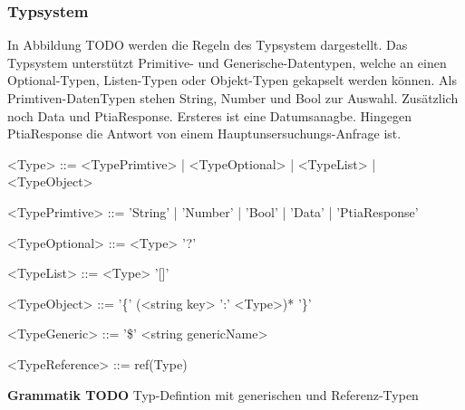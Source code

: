 \documentclass{article}
\begin{document}
    \subsubsection{Typsystem}
    In Abbildung TODO werden die Regeln des Typsystem dargestellt.
    Das Typsystem unterstützt Primitive- und Generische-Datentypen, welche an einen Optional-Typen, Listen-Typen oder Objekt-Typen gekapselt werden können.
    Als Primtiven-DatenTypen stehen String, Number und Bool zur Auswahl. Zusätzlich noch Data und PtiaResponse. 
    Ersteres ist eine Datumsanagbe. Hingegen PtiaResponse die Antwort von einem Hauptunsersuchungs-Anfrage ist.\\
    \begin{grammar}
        <Type> ::= <TypePrimtive> | <TypeOptional> | <TypeList> | <TypeObject>

        <TypePrimtive> ::= 'String' | 'Number' | 'Bool' | 'Data' | 'PtiaResponse'
        
        <TypeOptional> ::= <Type> '?'
        
        <TypeList> ::= <Type> '[]'
        
        <TypeObject> ::= '\{' (<string key> ':' <Type>)* '\}'

        <TypeGeneric> ::= '\$' <string genericName>

        <TypeReference> ::= ref(Type)
    \end{grammar}
    \textbf{Grammatik TODO} Typ-Defintion mit generischen und Referenz-Typen
\end{document}
